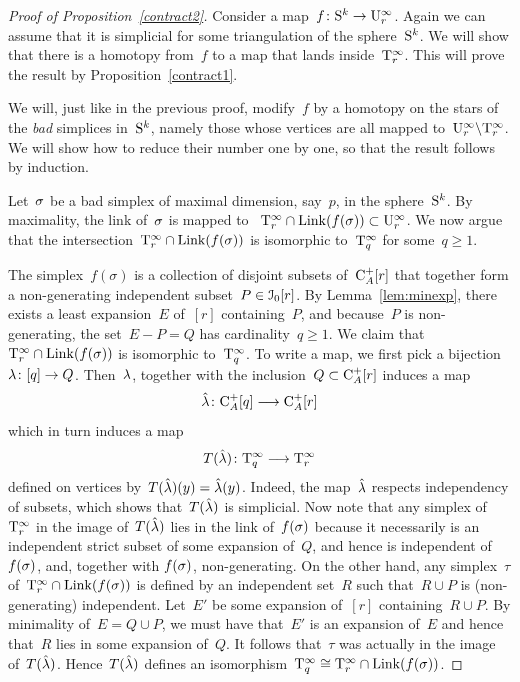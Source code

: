 \begin{proof}[Proof of Proposition~\ref{contract2}]
Consider a map~$f\colon\mathrm{S}^k\to\mathrm{U}_r^{\infty}$. Again we can assume that it is simplicial for some triangulation of the sphere~$\mathrm{S}^k$. We will show that there is a homotopy from~$f$ to a map that lands inside~$\mathrm{T}_r^\infty$. This will prove the result by Proposition~\ref{contract1}. 

We will, just like in the previous proof, modify~$f$ by a homotopy on the stars of the {\it bad} simplices in~$\mathrm{S}^k$, namely those whose vertices are all mapped to~$\mathrm{U}_r^\infty\backslash\mathrm{T}_r^\infty$. We will show how to reduce their number one by one, so that the result follows by induction.

Let~$\sigma$ be a bad simplex of maximal dimension, say~$p$, in the sphere~$\mathrm{S}^k$. By maximality, the link of~$\sigma$ is mapped to
~\hbox{$\mathrm{T}_r^\infty\cap\operatorname{Link}(f(\sigma))\subset \mathrm{U}_r^\infty$}.  
We now argue that the intersection~\hbox{$\mathrm{T}_r^\infty\cap\operatorname{Link}(f(\sigma))$} is isomorphic to~$\mathrm{T}_{q}^\infty$ for some~$q\geqslant1$.

The simplex~$f(\sigma)$ is a collection of disjoint subsets of~$\mathrm{C}_{A}^+[r]$ that together form a non-generating independent subset~$P\in \mathcal{I}_0[r]$. By Lemma~\ref{lem:minexp}, there exists a least expansion~$E$ of~$[r]$ containing~$P$, and because~$P$ is non-generating, the set~$E\minus P=Q$ has cardinality~$q\ge 1$. 
We claim that~$\mathrm{T}_r^\infty\cap\operatorname{Link}(f(\sigma))$ is isomorphic to~$\mathrm{T}_q^\infty$. 
To write a map, we first pick a bijection~$\lambda\colon[q]\to Q$.  Then~$\lambda$, together with the inclusion~$Q\subset\mathrm{C}_A^+[r]$ induces a map 
$$\hat{\lambda}\colon \mathrm{C}_A^+[q] \longrightarrow \mathrm{C}_A^+[r]$$
which in turn induces a map 
$$T(\hat {\lambda})\colon \mathrm{T}_q^\infty \longrightarrow \mathrm{T}_r^\infty$$
defined on vertices by~$T(\hat{\lambda})(y)=\hat{\lambda}(y)$. 
Indeed, the map~$\hat{\lambda}$ respects independency of subsets, which shows that~$T(\hat{\lambda})$ is simplicial. 
Now note that any simplex of~$\mathrm{T}_r^\infty$ in the image of~$T(\hat {\lambda})$ lies in the link of~$f(\sigma)$ because it necessarily is an independent strict subset of some expansion of~$Q$, and hence is independent of~$f(\sigma)$, and, together with $f(\sigma)$, non-generating. On the other hand, any simplex~$\tau$ of~$\mathrm{T}_r^\infty\cap\operatorname{Link}(f(\sigma))$ is defined by an independent set~$R$ such that~$R\cup P$ is (non-generating) independent. Let~$E'$ be some expansion of~$[r]$ containing~$R\cup P$. By minimality of~$E=Q\cup P$, we must have that~$E'$ is an expansion of~$E$ and hence that~$R$ lies in some expansion of~$Q$. It follows that~$\tau$ was actually in the image of~$T(\hat {\lambda})$. 
Hence~$T(\hat{\lambda})$ defines an isomorphism~\hbox{$\mathrm{T}_q^\infty\cong \mathrm{T}_r^\infty\cap\operatorname{Link}(f(\sigma))$}. 




\end{proof}
